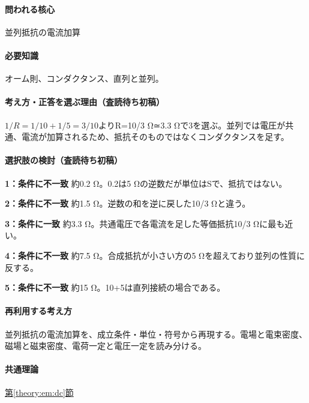 \paragraph{問われる核心} 並列抵抗の電流加算

\paragraph{必要知識} オーム則、コンダクタンス、直列と並列。

\paragraph{考え方・正答を選ぶ理由（査読待ち初稿）} \(1/R=1/10+1/5=3/10\)よりR=\allowbreak{}10/3 Ω≃3.3 Ωで3を選ぶ。並列では電圧が共通、電流が加算されるため、抵抗そのものではなくコンダクタンスを足す。

\paragraph{選択肢の検討（査読待ち初稿）}\mbox{}\par

\noindent\textbf{1：条件に不一致} 約0.2 Ω。0.2は5 Ωの逆数だが単位はSで、抵抗ではない。\par

\noindent\textbf{2：条件に不一致} 約1.5 Ω。逆数の和を逆に戻した10/3 Ωと違う。\par

\noindent\textbf{3：条件に一致} 約3.3 Ω。共通電圧で各電流を足した等価抵抗10/3 Ωに最も近い。\par

\noindent\textbf{4：条件に不一致} 約7.5 Ω。合成抵抗が小さい方の5 Ωを超えており並列の性質に反する。\par

\noindent\textbf{5：条件に不一致} 約15 Ω。10+5は直列接続の場合である。\par

\paragraph{再利用する考え方} 並列抵抗の電流加算を、成立条件・単位・符号から再現する。電場と電束密度、磁場と磁束密度、電荷一定と電圧一定を読み分ける。

\paragraph{共通理論} \hyperref[theory:em:dc]{第\ref*{theory:em:dc}節}

